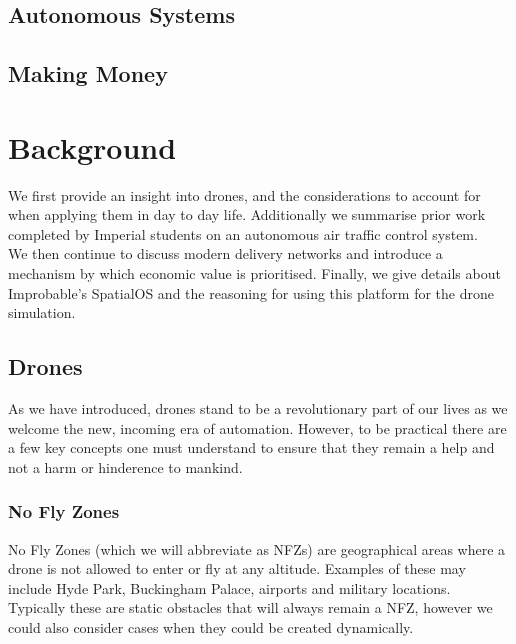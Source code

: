 \documentclass[a4paper,12pt,titlepage]{article}
\begin{document}






\subsection{Autonomous Systems}
\subsection{Making Money}


\newpage
\section{Background}
We first provide an insight into drones, and the considerations to account for when applying them in day to day life. Additionally we summarise prior work completed by Imperial students on an autonomous air traffic control system. \\

We then continue to discuss modern delivery networks and introduce a mechanism by which economic value is prioritised. Finally, we give details about Improbable's SpatialOS and the reasoning for using this platform for the drone simulation.

\subsection{Drones}
As we have introduced, drones stand to be a revolutionary part of our lives as we welcome the new, incoming era of automation. However, to be practical there are a few key concepts one must understand to ensure that they remain a help and not a harm or hinderence to mankind.

\subsubsection{No Fly Zones}
No Fly Zones (which we will abbreviate as NFZs) are geographical areas where a drone is not allowed to enter or fly at any altitude. Examples of these may include Hyde Park, Buckingham Palace, airports and military locations. Typically these are static obstacles that will always remain a NFZ, however we could also consider cases when they could be created dynamically.\\
\end{document}
